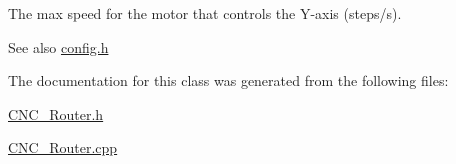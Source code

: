 The max speed for the motor that controls the Y-\/axis (steps/s). 

\begin{DoxySeeAlso}{See also}
\hyperlink{config_8h}{config.\+h} 
\end{DoxySeeAlso}


The documentation for this class was generated from the following files\+:\begin{DoxyCompactItemize}
\item 
\hyperlink{_c_n_c___router_8h}{C\+N\+C\+\_\+\+Router.\+h}\item 
\hyperlink{_c_n_c___router_8cpp}{C\+N\+C\+\_\+\+Router.\+cpp}\end{DoxyCompactItemize}
